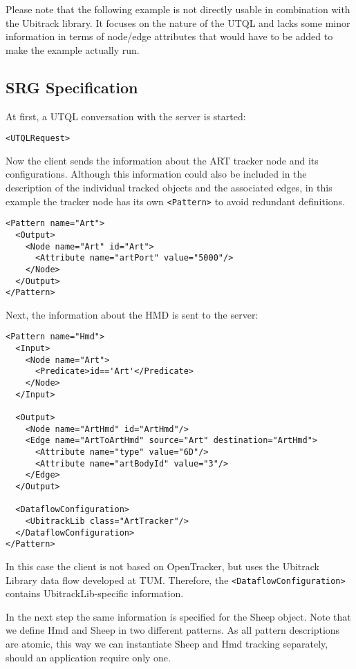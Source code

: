 \documentclass[11pt]{article}
\begin{document}
Please note that the following example is not directly usable in combination with the Ubitrack library. It focuses on the nature of the UTQL and lacks some minor information in terms of node/edge attributes that would have to be added to make the example actually run.

\subsection{SRG Specification}

At first, a UTQL conversation with the server is started:

\begin{Verbatim}[fontsize=\footnotesize,tabsize=2] 
<UTQLRequest>
\end{Verbatim} 

Now the client sends the information about
the ART tracker node and its configurations. Although this information could
also be included in the description of the individual tracked objects and the
associated edges, in this example the tracker node has its own 
\texttt{<Pattern>} to avoid redundant definitions.

\begin{Verbatim}[fontsize=\footnotesize,tabsize=2] 
<Pattern name="Art">
  <Output>
    <Node name="Art" id="Art">
      <Attribute name="artPort" value="5000"/>
    </Node>
  </Output>
</Pattern>
\end{Verbatim} 

Next, the information about the HMD is sent to the server:

\begin{Verbatim}[fontsize=\footnotesize,tabsize=2] 
<Pattern name="Hmd">
  <Input>
    <Node name="Art">
      <Predicate>id=='Art'</Predicate>
    </Node>
  </Input>

  <Output>
    <Node name="ArtHmd" id="ArtHmd"/>
    <Edge name="ArtToArtHmd" source="Art" destination="ArtHmd"> 
      <Attribute name="type" value="6D"/>
      <Attribute name="artBodyId" value="3"/>
    </Edge>
  </Output>

  <DataflowConfiguration>
    <UbitrackLib class="ArtTracker"/>
  </DataflowConfiguration>
</Pattern>
\end{Verbatim} 

In this case the client is not based on OpenTracker, but uses the Ubitrack Library data flow developed at TUM.
Therefore, the \texttt{<Dataflow\-Con\-fig\-u\-ra\-tion>} contains UbitrackLib-specific information.

In the next step the same information is
specified for the Sheep object. Note that we define Hmd and Sheep in two
different patterns. As all pattern descriptions are atomic, this way we can
instantiate Sheep and Hmd tracking separately, should an application require
only one.
\end{document}
